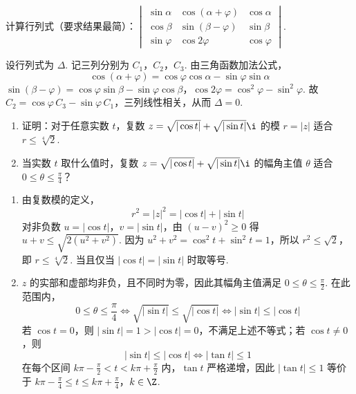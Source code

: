 \documentclass[UTF8,a4paper,oneside,11pt]{ctexbook}
\begin{document}
\begin{problem}
计算行列式（要求结果最简）：\(\begin{vmatrix}\sin \alpha & \cos \left(\alpha + \varphi\right) & \cos \alpha \\ \cos \beta & \sin \left(\beta - \varphi\right) & \sin \beta \\ \sin \varphi & \cos 2 \varphi & \cos \varphi\end{vmatrix}\).

\begin{solution}
设行列式为 \(\Delta\). 记三列分别为 \(C_{1}\)，\(C_{2}\)，\(C_{3}\). 由三角函数加法公式，
\[
\cos(\alpha+\varphi)=\cos\varphi\cos\alpha-\sin\varphi\sin\alpha
\]
\(\sin(\beta-\varphi)=\cos\varphi\sin\beta-\sin\varphi\cos\beta\)，\(\cos2\varphi=\cos^{2}\varphi-\sin^{2}\varphi\).
故 \(C_{2}=\cos\varphi\,C_{3}-\sin\varphi\,C_{1}\)，三列线性相关，从而 \(\Delta=0\).
\end{solution}
\end{problem}

\begin{problem}
\begin{enumerate}
\item 证明：对于任意实数 \(t\)，复数 \(z = \sqrt{|\cos t|} + \sqrt{|\sin t|}\i\) 的模 \(r = |z|\) 适合 \(r \leqslant \sqrt[4]{2}\).
\item 当实数 \(t\) 取什么值时，复数 \(z = \sqrt{|\cos t|} + \sqrt{|\sin t|}\i\) 的幅角主值 \(\theta\) 适合 \(0 \leqslant \theta \leqslant \frac{\pi}{4}\)？
\end{enumerate}

\begin{solution}
\begin{enumerate}
\item 由复数模的定义，
\[
r^{2}=|z|^{2}=|\cos t|+|\sin t|
\]
对非负数 \(u=|\cos t|\)，\(v=|\sin t|\)，由 \((u-v)^{2}\geqslant0\) 得 \(u+v\leqslant\sqrt{2(u^{2}+v^{2})}\). 因为 \(u^{2}+v^{2}=\cos^{2}t+\sin^{2}t=1\)，所以 \(r^{2}\leqslant\sqrt{2}\)，即 \(r\leqslant\sqrt[4]{2}\). 当且仅当 \(|\cos t|=|\sin t|\) 时取等号.
\item \(z\) 的实部和虚部均非负，且不同时为零，因此其幅角主值满足 \(0\leqslant\theta\leqslant\frac{\pi}{2}\). 在此范围内，
\[
0\leqslant\theta\leqslant\frac{\pi}{4}\iff \sqrt{|\sin t|}\leqslant\sqrt{|\cos t|}\iff |\sin t|\leqslant|\cos t|
\]
若 \(\cos t=0\)，则 \(|\sin t|=1>|\cos t|=0\)，不满足上述不等式；若 \(\cos t\neq0\)，则
\[
|\sin t|\leqslant|\cos t|\iff |\tan t|\leqslant1
\]
在每个区间 \(k\pi-\frac{\pi}{2}<t<k\pi+\frac{\pi}{2}\) 内，\(\tan t\) 严格递增，因此 \(|\tan t|\leqslant1\) 等价于
\(k\pi-\frac{\pi}{4}\leqslant t\leqslant k\pi+\frac{\pi}{4}\)，\(k\in\Z\).
\end{enumerate}
\end{solution}
\end{problem}
\end{document}
